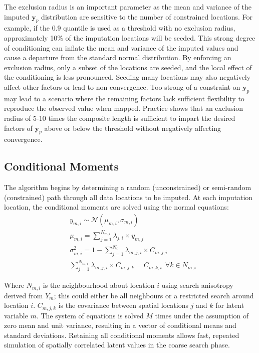 The exclusion radius is an important parameter as the mean and variance of the imputed $\mathbf{y}_{p}$ distribution are sensitive to the number of constrained locations. For example, if the 0.9 quantile is used as a threshold with no exclusion radius, approximately 10\% of the imputation locations will be seeded. This strong degree of conditioning can inflate the mean and variance of the imputed values and cause a departure from the standard normal distribution. By enforcing an exclusion radius, only a subset of the locations are seeded, and the local effect of the conditioning is less pronounced. Seeding many locations may also negatively affect other factors or lead to non-convergence. Too strong of a constraint on $\mathbf{y}_{p}$ may lead to a scenario where the remaining factors lack sufficient flexibility to reproduce the observed value when mapped. Practice shows that an exclusion radius of 5-10 times the composite length is sufficient to impart the desired factors of $\mathbf{y}_{p}$ above or below the threshold without negatively affecting convergence.

\subsection{Conditional Moments}
\label{subsec:condmom}

The algorithm begins by determining a random (unconstrained) or semi-random (constrained) path through all data locations to be imputed. At each imputation location, the conditional moments are solved using the normal equations:
\begin{align}
     & y_{m,i} \sim {\mathcal {N}}\left( \mu_{m,i}, \sigma_{m,i} \right)                           \\
     & \mu_{m,i} = \sum_{j=1}^{N_{m,i}} \lambda_{j,i} \times y_{m,j}                               \\
     & \sigma_{m,i}^{2} = 1 - \sum_{j=1}^{N_{i}} \lambda_{m,j,i} \times C_{m,j,i}                  \\
     & \sum_{j=1}^{N_{m,i}} \lambda_{m,j,i} \times C_{m,j,k} = C_{m,k,i} \ \ \forall k \in N_{m,i}
\end{align}

Where $N_{m,i}$ is the neighbourhood about location $i$ using search anisotropy derived from $Y_{m}$; this could either be all neighbours or a restricted search around location $i$. $C_{m,j,k}$ is the covariance between spatial locations $j$ and $k$ for latent variable $m$. The system of equations is solved $M$ times under the assumption of zero mean and unit variance, resulting in a vector of conditional means and standard deviations. Retaining all conditional moments allows fast, repeated simulation of spatially correlated latent values in the coarse search phase.

